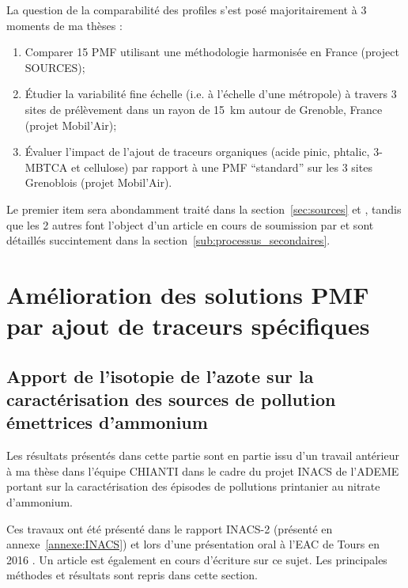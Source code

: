 La question de la comparabilité des profiles s'est posé majoritairement à 3 moments de ma
thèses :
\begin{enumerate}
    \item Comparer 15 PMF utilisant une méthodologie harmonisée en France (project
        SOURCES);
    \item Étudier la variabilité fine échelle (i.e. à l'échelle d'une métropole) à travers
        3 sites de prélèvement dans un rayon de \SI{15}{\kilo\m} autour de Grenoble, France
        (projet Mobil'Air);
    \item Évaluer l'impact de l'ajout de traceurs organiques (acide pinic, phtalic,
        3-MBTCA et cellulose) par rapport à une PMF ``standard'' sur les 3 sites
        Grenoblois (projet Mobil'Air).
\end{enumerate}

Le premier item sera abondamment traité dans la section~\ref{sec:sources} et
\textcite{weberComparison2019}, tandis que les 2 autres font l'object d'un article en
cours de soumission par \textcite{borlazaFinescaleinprep.} et sont détaillés succintement
dans la section~\ref{sub:processus_secondaires}.

\section{Amélioration des solutions PMF par ajout de traceurs spécifiques}%
\label{sec:amélioration_des_solutions_pmf}

\subsection{Apport de l'isotopie de l'azote sur la caractérisation des sources de pollution émettrices d’ammonium}%
\label{sub:isotopie}

Les résultats présentés dans cette partie sont en partie issu d'un travail antérieur à ma
thèse dans l'équipe CHIANTI dans le cadre du projet INACS de l'ADEME portant sur
la caractérisation des épisodes de pollutions printanier au nitrate d'ammonium.

\begin{tcolorbox}[colback=red!5!white,colframe=Melon,title=Note]
    Ces travaux ont été présenté dans le rapport INACS-2 (présenté en
    annexe~\ref{annexe:INACS}) et lors d'une présentation oral à l'EAC de Tours en 2016
    \autocite{weberNitrogen5}.
    Un article est également en cours d'écriture sur ce sujet.  Les principales méthodes
    et résultats sont repris dans cette section.
\end{tcolorbox}

